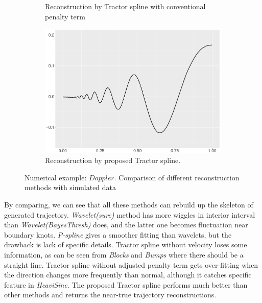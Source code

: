 \begin{figure}
\begin{subfigure}{0.45\textwidth}
    \caption{Reconstruction by Tractor spline with conventional penalty term}
    \end{subfigure}
    \begin{subfigure}{0.45\textwidth}
    \centering
    \includegraphics[width=\linewidth,height=0.45\textwidth]{Chapters/02TractorSplineTheory/plot/ggplot/ggDopplerTractor.pdf}
    \caption{Reconstruction by proposed Tractor spline.}
    \end{subfigure}
\caption{Numerical example: $\textit{Doppler}$. Comparison of different reconstruction methods with simulated data}\label{num4}
 \end{figure}

By comparing, we can see that all these methods can rebuild up the skeleton of generated trajectory. \textit{Wavelet(sure)} method has more wiggles in interior interval than \textit{Wavelet(BayesThresh)} does, and the latter one becomes fluctuation near boundary knots. \textit{P-spline} gives a smoother fitting than wavelets, but the drawback is lack of specific details. Tractor spline without velocity loses some information, as can be seen from \textit{Blocks} and \textit{Bumps} where there should be a straight line. Tractor spline without adjusted penalty term gets over-fitting when the direction changes more frequently than normal, although it catches specific feature in \textit{HeaviSine}. The proposed Tractor spline performs much better than other methods and returns the near-true trajectory reconstructions.  




